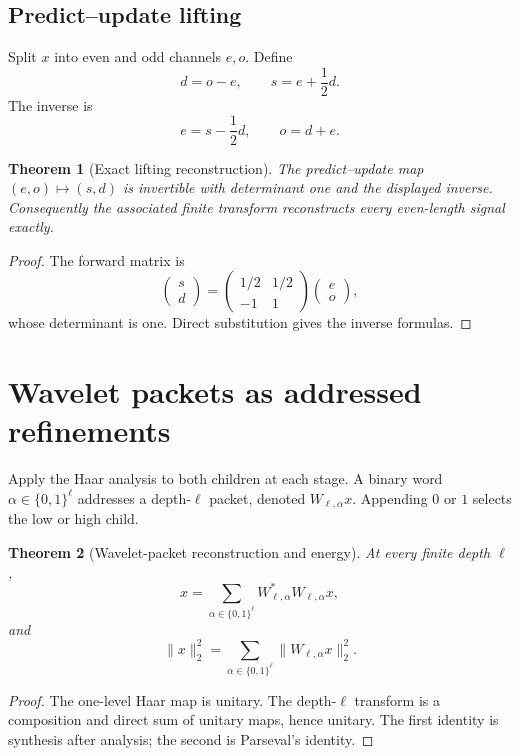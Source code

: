 \documentclass[11pt]{article}
\newtheorem{theorem}{Theorem}[section]
\theoremstyle{definition}
\theoremstyle{remark}
\begin{document}
\subsection{Predict--update lifting}

Split $x$ into even and odd channels $e,o$. Define
\[
d=o-e,
\qquad
s=e+\frac12d.
\]
The inverse is
\[
e=s-\frac12d,
\qquad
o=d+e.
\]

\begin{theorem}[Exact lifting reconstruction]
The predict--update map $(e,o)\mapsto(s,d)$ is invertible with determinant one and the displayed inverse. Consequently the associated finite transform reconstructs every even-length signal exactly.
\end{theorem}

\begin{proof}
The forward matrix is
\[
\begin{pmatrix}s\\d\end{pmatrix}
=
\begin{pmatrix}1/2&1/2\\-1&1\end{pmatrix}
\begin{pmatrix}e\\o\end{pmatrix},
\]
whose determinant is one. Direct substitution gives the inverse formulas.
\end{proof}

\section{Wavelet packets as addressed refinements}

Apply the Haar analysis to both children at each stage. A binary word $\alpha\in\{0,1\}^{\ell}$ addresses a depth-$\ell$ packet, denoted $W_{\ell,\alpha}x$. Appending $0$ or $1$ selects the low or high child.

\begin{theorem}[Wavelet-packet reconstruction and energy]
At every finite depth $\ell$,
\[
\boxed{
x=\sum_{\alpha\in\{0,1\}^{\ell}}W_{\ell,\alpha}^{*}W_{\ell,\alpha}x,
}
\]
and
\[
\boxed{
\|x\|_2^2
=
\sum_{\alpha\in\{0,1\}^{\ell}}
\|W_{\ell,\alpha}x\|_2^2.
}
\]
\end{theorem}

\begin{proof}
The one-level Haar map is unitary. The depth-$\ell$ transform is a composition and direct sum of unitary maps, hence unitary. The first identity is synthesis after analysis; the second is Parseval's identity.
\end{proof}
\end{document}
